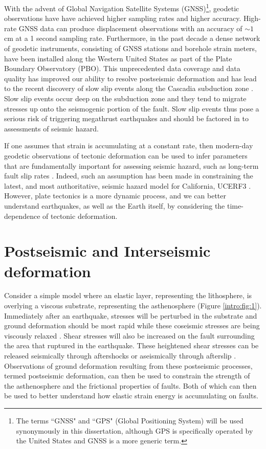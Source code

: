 With the advent of Global Navigation Satellite Systems
(GNSS)\footnote{The terms ``GNSS" and ``GPS" (Global Positioning
System) will be used synonymously in this dissertation, although GPS
is specifically operated by the United States and GNSS is a more
generic term.}, geodetic observations have have achieved higher
sampling rates and higher accuracy. High-rate GNSS data can produce
displacement observations with an accuracy of ${\sim}1$ cm at a 1
second sampling rate. Furthermore, in the past decade a dense network
of geodetic instruments, consisting of GNSS stations and borehole
strain meters, have been installed along the Western United States as
part of the Plate Boundary Observatory (PBO). This unprecedented data
coverage and data quality has improved our ability to resolve
postseismic deformation and has lead to the recent discovery of slow
slip events along the Cascadia subduction zone \citep{Dragert2001}.
Slow slip events occur deep on the subduction zone and they tend to
migrate stresses up onto the seismogenic portion of the fault. Slow
slip events thus pose a serious risk of triggering megathrust
earthquakes and should be factored in to assessments of seismic
hazard.

If one assumes that strain is accumulating at a constant
rate, then modern-day geodetic observations of tectonic deformation
can be used to infer parameters that are fundamentally important for
assessing seismic hazard, such as long-term fault slip rates
\citep[e.g.,][]{Savage1973,Meade2005}. Indeed, such an assumption has
been made in constraining the latest, and most authoritative, seismic
hazard model for California, UCERF3 \citep{Field2014}. However, plate
tectonics is a more dynamic process, and we can better understand
earthquakes, as well as the Earth itself, by considering the
time-dependence of tectonic deformation.

\section{Postseismic and Interseismic deformation}

Consider a simple model where an elastic layer, representing the
lithosphere, is overlying a viscous substrate, representing the
asthenosphere (Figure \ref{intro:fig:1}). Immediately after an
earthquake, stresses will be perturbed in the substrate and ground
deformation should be most rapid while these coseismic stresses are
being viscously relaxed \citep{Nur1974,Savage1978}. Shear stresses
will also be increased on the fault surrounding the area that ruptured
in the earthquake. These heightened shear stresses can be released
seismically through aftershocks or aseismically through afterslip
\citep{Marone1991}. Observations of ground deformation resulting from
these postseismic processes, termed postseismic deformation, can then
be used to constrain the strength of the asthenosphere and the
frictional properties of faults. Both of which can then be used to
better understand how elastic strain energy is accumulating on faults.

